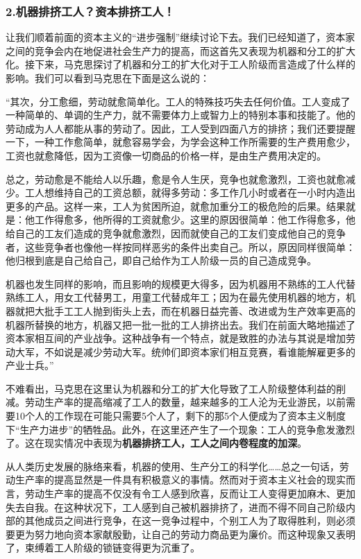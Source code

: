 \documentclass[a4paper,twoside,12pt,AutoFakeBold]{ctexart}
\begin{document}
\subsubsection{2.机器排挤工人？资本排挤工人！}
让我们顺着前面的资本主义的“进步强制”继续讨论下去。我们已经知道了，资本家之间的竞争会内在地促进社会生产力的提高，而这首先又表现为机器和分工的扩大化。接下来，马克思探讨了机器和分工的扩大化对于工人阶级而言造成了什么样的影响。我们可以看到马克思在下面是这么说的：
\begin{adjustwidth}{2em}{2em}
    \qquad\fangsong
“其次，分工愈细，劳动就愈简单化。工人的特殊技巧失去任何价值。工人变成了一种简单的、单调的生产力，就不需要体力上或智力上的特别本事和技能了。他的劳动成为人人都能从事的劳动了。因此，工人受到四面八方的排挤；我们还要提醒一下，一种工作愈简单，就愈容易学会，为学会这种工作所需要的生产费用愈少，工资也就愈降低，因为工资像一切商品的价格一样，是由生产费用决定的。

总之，劳动愈是不能给人以乐趣，愈是令人生厌，竞争也就愈激烈，工资也就愈减少。工人想维持自己的工资总额，就得多劳动：多工作几小时或者在一小时内造出更多的产品。这样一来，工人为贫困所迫，就愈加重分工的极危险的后果。结果就是：他工作得愈多，他所得的工资就愈少。这里的原因很简单：他工作得愈多，他给自己的工友们造成的竞争就愈激烈，因而就使自己的工友们变成他自己的竞争者，这些竞争者也像他一样按同样恶劣的条件出卖自己。所以，原因同样很简单：他归根到底是自己给自己，即自己给作为工人阶级一员的自己造成竞争。

机器也发生同样的影响，而且影响的规模更大得多，因为机器用不熟练的工人代替熟练工人，用女工代替男工，用童工代替成年工；因为在最先使用机器的地方，机器就把大批手工工人抛到街头上去，而在机器日益完善、改进或为生产效率更高的机器所替换的地方，机器又把一批一批的工人排挤出去。我们在前面大略地描述了资本家相互间的产业战争。这种战争有一个特点，就是致胜的办法与其说是增加劳动大军，不如说是减少劳动大军。统帅们即资本家们相互竞赛，看谁能解雇更多的产业士兵。”
\end{adjustwidth}
不难看出，马克思在这里认为机器和分工的扩大化导致了工人阶级整体利益的削减。劳动生产率的提高缩减了工人的数量，越来越多的工人沦为无业游民，以前需要10个人的工作现在可能只需要5个人了，剩下的那5个人便成为了资本主义制度下“生产力进步”的牺牲品。此外，在这里还产生了一个现象：工人的竞争愈发激烈了。这在现实情况中表现为\textbf{机器排挤工人，工人之间内卷程度的加深}。

从人类历史发展的脉络来看，机器的使用、生产分工的科学化……总之一句话，劳动生产率的提高显然是一件具有积极意义的事情。然而对于资本主义社会的现实而言，劳动生产率的提高不仅没有令工人感到欣喜，反而让工人变得更加麻木、更加失去自我。在这种状况下，工人感到自己被机器排挤了，进而不得不同自己阶级内部的其他成员之间进行竞争，在这一竞争过程中，个别工人为了取得胜利，则必须要更为努力地向资本家献殷勤，让自己的劳动力商品更为廉价。而这种现象又表明了，束缚着工人阶级的锁链变得更为沉重了。
\end{document}
